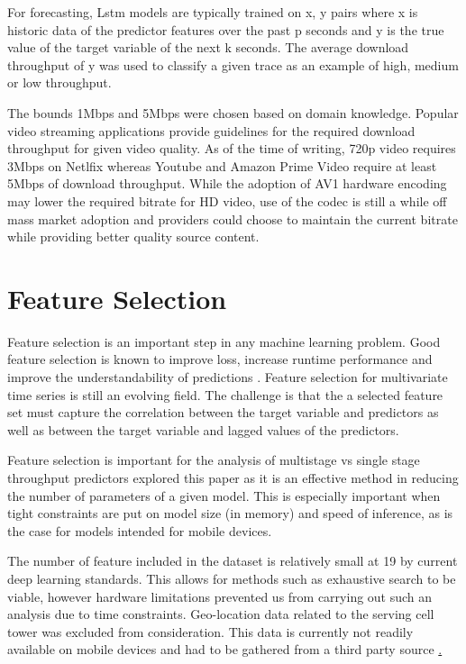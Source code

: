 For forecasting, Lstm models are typically trained on x, y pairs where x is historic data of the predictor features over the past p seconds and y is the true value of the target variable of the next k seconds. The average download throughput of y was used to classify a given trace as an example of high, medium or low throughput.

The bounds 1Mbps and 5Mbps were chosen based on domain knowledge. Popular video streaming applications provide guidelines for the required download throughput for given video quality. As of the time of writing, 720p video requires 3Mbps on Netlfix whereas Youtube and Amazon Prime Video require at least 5Mbps of download throughput. While the adoption of AV1 hardware encoding may lower the required bitrate for HD video, use of the codec is still a while off mass market adoption and providers could choose to maintain the current bitrate while providing better quality source content.

\section{Feature Selection}
Feature selection is an important step in any machine learning problem. Good feature selection is known to improve loss, increase runtime performance and improve the understandability of predictions \cite{guyon2003introduction}.
Feature selection for multivariate time series is still an evolving field. The challenge is that the a selected feature set must capture the correlation between the target variable and predictors as well as between the target variable and lagged values of the predictors.

Feature selection is important for the analysis of multistage vs single stage throughput predictors explored this paper as it is an effective method in reducing the number of parameters of a given model. This is especially important when tight constraints are put on model size (in memory) and speed of inference, as is the case for models intended for mobile devices.

The number of feature included in the dataset is relatively small at 19 by current deep learning standards. This allows for methods such as exhaustive search to be viable, however hardware limitations prevented us from carrying out such an analysis due to time constraints. Geo-location data related to the serving cell tower was excluded from consideration. This data is currently not readily available on mobile devices and had to be gathered from a third party source \href{https://opencellid.org/}.

